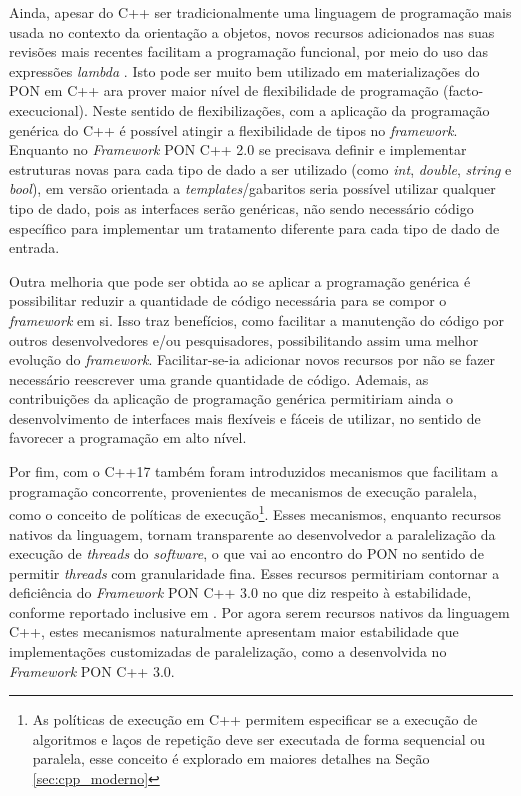 Ainda, apesar do C++ ser tradicionalmente uma linguagem de programação mais
usada no contexto da orientação a objetos, novos recursos adicionados nas suas
revisões mais recentes facilitam a programação funcional, por meio do uso das
expressões \textit{lambda} \cite{bjarne_2020}. Isto pode ser muito bem utilizado
em materializações do PON em C++  ara prover maior nível de flexibilidade de
programação (facto-execucional). Neste sentido de flexibilizações, com a
aplicação da programação genérica do C++ é possível atingir a flexibilidade de
tipos no \textit{framework}. Enquanto no \textit{Framework} PON C++ 2.0 se
precisava definir e implementar estruturas novas para cada tipo de dado a ser
utilizado (como \textit{int}, \textit{double}, \textit{string} e \textit{bool}),
em versão orientada a \textit{templates}/gabaritos seria possível utilizar
qualquer tipo de dado, pois as interfaces serão genéricas, não sendo necessário
código específico para implementar um tratamento diferente para cada tipo de
dado de entrada.

Outra melhoria que pode ser obtida ao se aplicar a programação genérica é
possibilitar reduzir a quantidade de código necessária para se compor o
\textit{framework} em si. Isso traz benefícios, como facilitar a manutenção do
código por outros desenvolvedores e/ou pesquisadores, possibilitando assim uma
melhor evolução do \textit{framework}. Facilitar-se-ia adicionar novos recursos
por não se fazer necessário reescrever uma grande quantidade de código. Ademais,
as contribuições da aplicação de programação genérica permitiriam ainda o
desenvolvimento de interfaces mais flexíveis e fáceis de utilizar, no sentido de favorecer a
programação em alto nível.

Por fim, com o C++17 também foram introduzidos mecanismos que facilitam a
programação concorrente, provenientes de mecanismos de execução paralela, como o
conceito de políticas de execução\footnote{As políticas de execução em C++
permitem especificar se a execução de algoritmos e laços de repetição deve ser
executada de forma sequencial ou paralela, esse conceito é explorado em maiores
detalhes na Seção \ref{sec:cpp_moderno}}. Esses mecanismos, enquanto recursos
nativos da linguagem, tornam transparente ao desenvolvedor a paralelização da
execução de \textit{threads} do \textit{software}, o que vai ao encontro do PON
no sentido de permitir \textit{threads} com granularidade fina. Esses recursos
permitiriam contornar a deficiência do \textit{Framework} PON C++ 3.0 no que diz
respeito à estabilidade, conforme reportado inclusive em
. Por agora serem recursos nativos da linguagem
C++, estes mecanismos naturalmente apresentam maior estabilidade que
implementações customizadas de paralelização, como a desenvolvida no
\textit{Framework} PON C++ 3.0.

